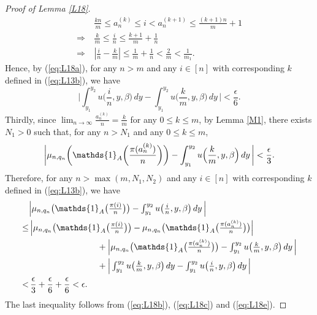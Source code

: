 \begin{proof}[Proof of Lemma \ref{L18}]
\begin{align*}
  &\frac{k n}{m} \le a^{(k)}_n \le i < a^{(k+1)}_n \le \frac{(k+1) n}{m} + 1\\
  \Rightarrow\ & \frac{k}{m} \le \frac{i}{n} \le \frac{k+1}{m} + \frac{1}{n}\\
  \Rightarrow\ & \left| \frac{i}{n} - \frac{k}{m} \right| \le \frac{1}{m} + \frac{1}{n} < \frac{2}{m} < \frac{1}{m_1}.
\end{align*}
Hence, by (\ref{eq:L18a}), for any $n > m$ and any $i \in [n]$ with corresponding $k$ defined in (\ref{eq:L13b}), we have
\begin{equation}
\Big|\int_{y_1}^{y_2} u\Big(\frac{i}{n}, y, \beta\Big)\, dy - \int_{y_1}^{y_2} u\Big(\frac{k}{m}, y, \beta\Big)\, dy \,\Big|
 < \frac{\epsilon}{6}. \label{eq:L18c}
\end{equation}
Thirdly, since $\lim_{n \to \infty} \frac{a_n^{(k)}}{n} = \frac{k}{m}$ for any $0 \le k \le m$, by Lemma \ref{M1}, there exists $N_1 > 0$
such that, for any $n > N_1$ and any $0 \le k \le m$,
\begin{equation}
\bigg|\n \bigg(\mathds{1}_A\bigg(\frac{\pi(a_n^{(k)})}{n}\bigg)\bigg) - \int_{y_1}^{y_2} u\Big(\frac{k}{m}, y, \beta\Big)\, dy \,\bigg| < \frac{\epsilon}{3}. \label{eq:L18e}
\end{equation}
Therefore, for any $n > \max{(m, N_1, N_2)}$ and any $i \in [n]$ with corresponding $k$ defined in (\ref{eq:L13b}), we have
\begin{align}
   &\textstyle\Big|\n \big(\mathds{1}_A\big(\frac{\pi(i)}{n}\big)\big) - \int_{y_1}^{y_2} u\big(\frac{i}{n}, y, \beta\big)\, dy\, \Big| \nonumber\\
 \le&\, \textstyle\Big|\n \big(\mathds{1}_A\big(\frac{\pi(i)}{n}\big)\big) - \n \big(\mathds{1}_A\big(\frac{\pi(a_n^{(k)})}{n}\big)\big) \Big| \nonumber\\
  &\qquad\qquad\qquad\qquad \textstyle + \Big|\n \big(\mathds{1}_A\big(\frac{\pi(a_n^{(k)})}{n}\big)\big) - \int_{y_1}^{y_2} u\big(\frac{k}{m}, y, \beta\big)\, dy \,\Big| \nonumber\\
  &\qquad\qquad\qquad\qquad \textstyle + \Big|\int_{y_1}^{y_2} u\big(\frac{k}{m}, y, \beta\big)\, dy - \int_{y_1}^{y_2} u\big(\frac{i}{n}, y, \beta\big)\, dy \,\Big|  \nonumber\\
  <&\, \frac{\epsilon}{3} + \frac{\epsilon}{6} + \frac{\epsilon}{6} < \epsilon. \nonumber
\end{align}
The last inequality follows from (\ref{eq:L18b}), (\ref{eq:L18c}) and (\ref{eq:L18e}).
\end{proof}




